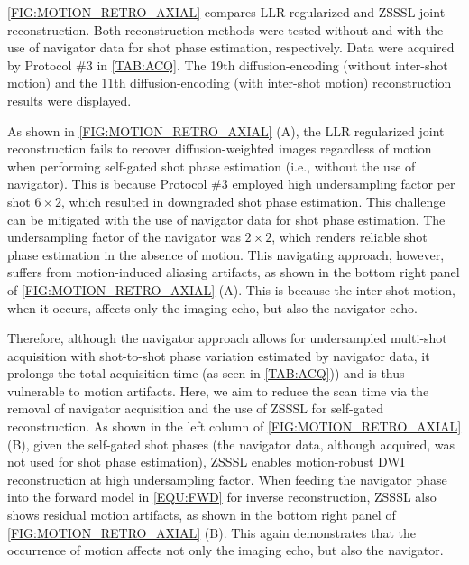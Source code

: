 \documentclass[journal,twoside,web]{ieeecolor}
\begin{document}
	\cref{FIG:MOTION_RETRO_AXIAL} compares LLR regularized
	and ZSSSL joint reconstruction.
	Both reconstruction methods were tested
	without and with the use of navigator data
	for shot phase estimation, respectively.
	Data were acquired by Protocol \#3 in \cref{TAB:ACQ}.
	The 19th diffusion-encoding (without inter-shot motion)
	and the 11th diffusion-encoding (with inter-shot motion)
	reconstruction results were displayed.

	As shown in \cref{FIG:MOTION_RETRO_AXIAL} (A),
	the LLR regularized joint reconstruction
	fails to recover diffusion-weighted images regardless of motion
	when performing self-gated shot phase estimation
	(i.e., without the use of navigator).
	This is because Protocol \#3 employed high undersampling factor per shot $6 \times 2$,
	which resulted in downgraded shot phase estimation.
	This challenge can be mitigated with the use of navigator data for shot phase estimation.
	The undersampling factor of the navigator was $2 \times 2$,
	which renders reliable shot phase estimation in the absence of motion.
	This navigating approach, however, suffers from motion-induced aliasing artifacts,
	as shown in the bottom right panel of \cref{FIG:MOTION_RETRO_AXIAL} (A).
	This is because the inter-shot motion, when it occurs, affects only the imaging echo,
	but also the navigator echo.

	Therefore, although the navigator approach allows for
	undersampled multi-shot acquisition with
	shot-to-shot phase variation estimated by navigator data,
	it prolongs the total acquisition time (as seen in \cref{TAB:ACQ}))
	and is thus vulnerable to motion artifacts.
	Here, we aim to reduce the scan time via the removal of navigator acquisition
	and the use of ZSSSL for self-gated reconstruction.
	As shown in the left column of \cref{FIG:MOTION_RETRO_AXIAL} (B),
	given the self-gated shot phases
	(the navigator data, although acquired, was not used for shot phase estimation),
	ZSSSL enables motion-robust DWI reconstruction at high undersampling factor.
	When feeding the navigator phase into the forward model in \cref{EQU:FWD}
	for inverse reconstruction, ZSSSL also shows residual motion artifacts,
	as shown in the bottom right panel of \cref{FIG:MOTION_RETRO_AXIAL} (B).
	This again demonstrates that
	the occurrence of motion affects not only the imaging echo,
	but also the navigator.
\end{document}
